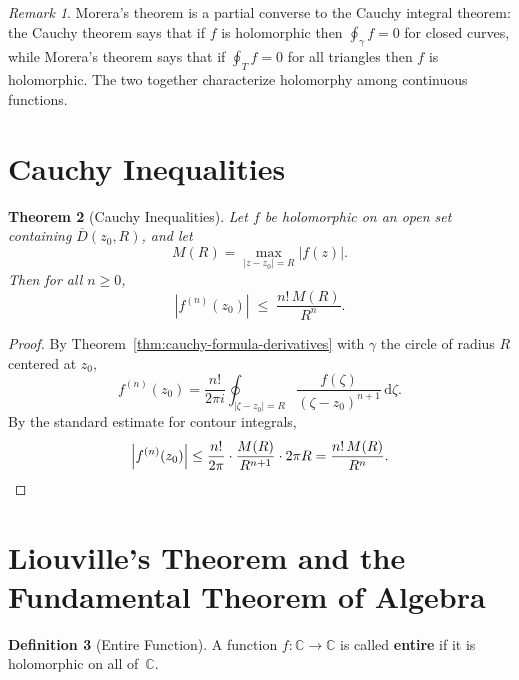 \documentclass[12pt,a4paper,openany]{book}
\theoremstyle{definition}
\newtheorem{definition}{Definition}[chapter]
\theoremstyle{plain}
\newtheorem{theorem}[definition]{Theorem}
\theoremstyle{remark}
\newtheorem{remark}[definition]{Remark}
\newcommand{\C}{\mathbb{C}}
\newcommand{\dd}{\mathrm{d}}
\newcommand{\abs}[1]{\left|#1\right|}
\begin{document}
\begin{remark}\label{rem:morera-converse}
Morera's theorem is a partial converse to the Cauchy integral theorem: the Cauchy
theorem says that if $f$ is holomorphic then $\oint_\gamma f = 0$ for closed
curves, while Morera's theorem says that if $\oint_T f = 0$ for all triangles
then $f$ is holomorphic. The two together characterize holomorphy among
continuous functions.
\end{remark}

\section{Cauchy Inequalities}
\label{sec:cauchy-inequalities}

\begin{theorem}[Cauchy Inequalities]\label{thm:cauchy-inequalities}
Let $f$ be holomorphic on an open set containing $\overline{D}(z_0,R)$, and let
\[
  M(R) = \max_{\abs{z-z_0}=R}\abs{f(z)}.
\]
Then for all $n\ge 0$,
\begin{equation}\label{eq:cauchy-inequality}
  \abs{f^{(n)}(z_0)} \;\le\; \frac{n!\,M(R)}{R^n}.
\end{equation}
\end{theorem}

\begin{proof}
By Theorem~\ref{thm:cauchy-formula-derivatives} with $\gamma$ the circle of
radius $R$ centered at $z_0$,
\[
  f^{(n)}(z_0) = \frac{n!}{2\pi i}\oint_{\abs{\zeta-z_0}=R}
    \frac{f(\zeta)}{(\zeta-z_0)^{n+1}}\,\dd\zeta.
\]
By the standard estimate for contour integrals,
\[
  \abs{f^{(n)}(z_0)}
  \le \frac{n!}{2\pi}\cdot\frac{M(R)}{R^{n+1}}\cdot 2\pi R
  = \frac{n!\,M(R)}{R^n}.\qedhere
\]
\end{proof}

\section{Liouville's Theorem and the Fundamental Theorem of Algebra}
\label{sec:liouville}

\begin{definition}[Entire Function]\label{def:entire}
A function $f\colon\C\to\C$ is called \textbf{entire} if it is holomorphic on
all of~$\C$.
\end{definition}
\end{document}
